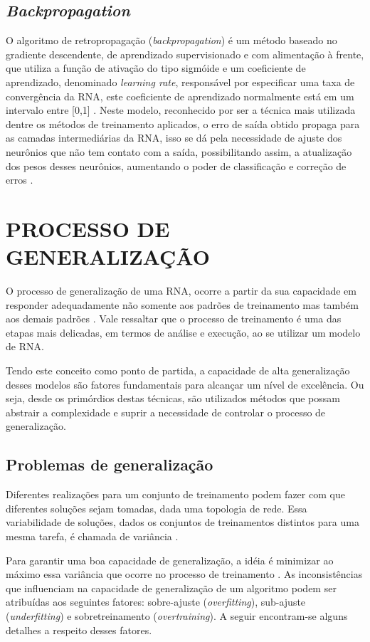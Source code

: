 \subsection{\textit{Backpropagation}}
O algoritmo de retropropagação (\textit{backpropagation}) é um método baseado no gradiente descendente, de aprendizado supervisionado e com alimentação à frente, que utiliza a função de ativação do tipo sigmóide e um coeficiente de aprendizado, denominado \textit{learning rate}, responsável por especificar uma taxa de convergência da RNA, este coeficiente de aprendizado normalmente está em um intervalo entre [0,1]    \cite{haykin2000}.
Neste modelo, reconhecido por ser a técnica mais utilizada dentre os métodos de treinamento aplicados, o erro de saída obtido propaga para as camadas intermediárias da RNA, isso se dá pela necessidade de ajuste dos neurônios que não tem contato com a saída, possibilitando assim, a atualização dos pesos desses neurônios, aumentando o poder de classificação e correção de erros \cite{medeiros}.	

\section{PROCESSO DE GENERALIZAÇÃO}\label{rna-generalização}
O processo de generalização de uma RNA, ocorre a partir da sua capacidade em responder adequadamente não somente aos padrões de treinamento mas também aos demais padrões \cite{medeiros}. Vale ressaltar que o processo de treinamento é uma das etapas mais delicadas, em termos de análise e execução, ao se utilizar um modelo de RNA.

Tendo este conceito como ponto de partida, a capacidade de alta generalização desses modelos são fatores fundamentais para alcançar um nível de excelência. Ou seja, desde os primórdios destas técnicas, são utilizados métodos que possam abstrair a complexidade e suprir a necessidade de controlar o processo de generalização.

\subsection{Problemas de generalização}
 Diferentes realizações para um conjunto de treinamento podem fazer com que diferentes soluções sejam tomadas, dada uma topologia de rede. Essa variabilidade de soluções, dados os conjuntos de treinamentos distintos para uma mesma tarefa, é chamada de variância \cite{haykin2000}.
 
Para garantir uma boa capacidade de generalização, a idéia é minimizar ao máximo essa variância que ocorre no processo de treinamento \cite{medeiros}. As inconsistências que influenciam  na capacidade de generalização de um algoritmo podem ser atribuídas aos seguintes fatores: sobre-ajuste (\textit{overfitting}), sub-ajuste (\textit{underfitting}) e sobretreinamento (\textit{overtraining}). A seguir encontram-se alguns detalhes a respeito desses fatores.

